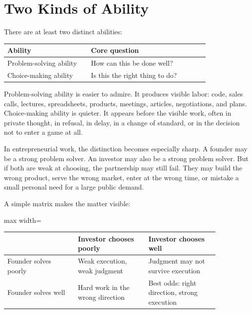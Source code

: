 \section*{Two Kinds of Ability}

There are at least two distinct abilities:

\begin{center}
\begin{tabular}{p{0.34\linewidth}p{0.48\linewidth}}
\hline
Ability & Core question \\
\hline
Problem-solving ability & How can this be done well? \\
Choice-making ability & Is this the right thing to do? \\
\hline
\end{tabular}
\end{center}

Problem-solving ability is easier to admire. It produces visible labor: code, sales calls, lectures, spreadsheets, products, meetings, articles, negotiations, and plans. Choice-making ability is quieter. It appears before the visible work, often in private thought, in refusal, in delay, in a change of standard, or in the decision not to enter a game at all.

In entrepreneurial work, the distinction becomes especially sharp. A founder may be a strong problem solver. An investor may also be a strong problem solver. But if both are weak at choosing, the partnership may still fail. They may build the wrong product, serve the wrong market, enter at the wrong time, or mistake a small personal need for a large public demand.

A simple matrix makes the matter visible:

\begin{center}
\begin{adjustbox}{max width=\linewidth}
\begin{tabular}{p{0.28\linewidth}p{0.29\linewidth}p{0.29\linewidth}}
\hline
 & Investor chooses poorly & Investor chooses well \\
\hline
Founder solves poorly & Weak execution, weak judgment & Judgment may not survive execution \\
Founder solves well & Hard work in the wrong direction & Best odds: right direction, strong execution \\
\hline
\end{tabular}
\end{adjustbox}
\end{center}

